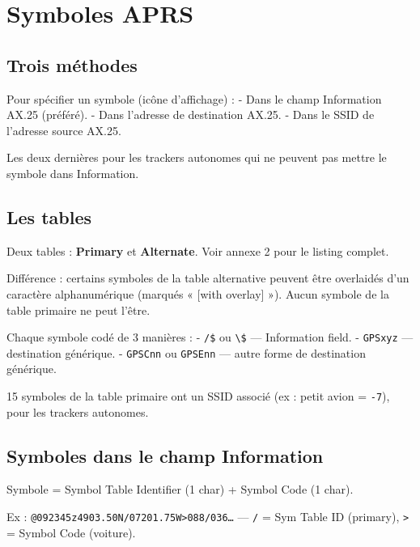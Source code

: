 \chapter[SYMBOLES APRS]{Symboles APRS}\label{symboles-aprs}

\section{Trois méthodes}\label{trois-muxe9thodes}

Pour spécifier un symbole (icône d'affichage) : - Dans le champ
Information AX.25 (préféré). - Dans l'adresse de destination AX.25. -
Dans le SSID de l'adresse source AX.25.

Les deux dernières pour les trackers autonomes qui ne peuvent pas mettre
le symbole dans Information.

\section{Les tables}\label{les-tables}

Deux tables : \textbf{Primary} et \textbf{Alternate}. Voir annexe 2 pour
le listing complet.

Différence : certains symboles de la table alternative peuvent être
overlaidés d'un caractère alphanumérique (marqués « {[}with overlay{]}
»). Aucun symbole de la table primaire ne peut l'être.

Chaque symbole codé de 3 manières : - \texttt{/\$} ou
\texttt{\textbackslash{}\$} --- Information field. - \texttt{GPSxyz} ---
destination générique. - \texttt{GPSCnn} ou \texttt{GPSEnn} --- autre
forme de destination générique.

15 symboles de la table primaire ont un SSID associé (ex : petit avion =
\texttt{-7}), pour les trackers autonomes.

\section{Symboles dans le champ
Information}\label{symboles-dans-le-champ-information}

Symbole = Symbol Table Identifier (1 char) + Symbol Code (1 char).

Ex : \texttt{@092345z4903.50N/07201.75W\textgreater{}088/036…} ---
\texttt{/} = Sym Table ID (primary), \texttt{\textgreater{}} = Symbol
Code (voiture).

